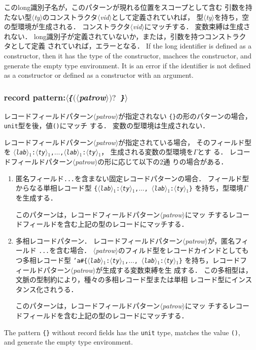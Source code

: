 \documentclass{jbook}
\newcommand{\txt}[2]{#2}
\newcommand{\code}[1]{\mbox{\large\tt #1}}
\newcommand{\nonterm}[1]{\mbox{$\langle$}{\it #1}\mbox{$\rangle$}}
\newcommand{\term}[1]{\mbox{{\tt #1}}}
\newcommand{\optional}[1]{\mbox{$($}{\protect #1}\mbox{$)?$}}
\newcommand{\ass}{\Gamma}
\begin{document}
\ifjp%
	このlong識別子名が，このパターンが現れる位置をスコープとして含む
引数を持たない型\nonterm{ty}のコンストラクタ\nonterm{vid}として定義されていれば，
型\nonterm{ty}を持ち，空の型環境が生成される．
	コンストラクタ\nonterm{vid}にマッチする．
	変数束縛は生成されない．
	long識別子が定義されていないか，または，引数を持つコンストラクタとして定義
されていれば，エラーとなる．
\else%
	If the long identifier is defined as a constructor, then it has the
type of the constructor, machces the constructor, and generate the empty
type environment.
	It is an error if the identifier is not defined as a constructor
or defined as a constructor with an argument.
\fi%

\subsubsection{\txt{レコードパターン}{record pattern}:\nonterm{\term{\{}\optional{\nonterm{patrow}}\ \term{\}}}}

\ifjp%
		レコードフィールドパターン\nonterm{patrow}が指定されない
\code{\{\}}の形のパターンの場合，\code{unit}型を後，値\code{()}にマッチ
する．
	変数の型環境は生成されない．

	レコードフィールドパターン\nonterm{patrow}が指定されている場合，
そのフィールド型を
\code{\nonterm{lab}$_1$:\nonterm{ty}$_1$,$\ldots$,\nonterm{lab}$_1$:\nonterm{ty}$_1$}，
生成される変数の型環境を$\ass$とす
る．
	レコードフィールドパターン\nonterm{patrow}の形に応じて以下の2通
りの場合がある．
\begin{enumerate}
\item 匿名フィールド\verb|...|を含まない固定レコードパターンの場合．
フィールド型からなる単相レコード型
\code{\{\nonterm{lab}$_1$:\nonterm{ty}$_1$,$\ldots$,
\nonterm{lab}$_1$:\nonterm{ty}$_1$\}}
を持ち，型環境$\ass$を生成する．

	このパターンは，レコードフィールドパターン\nonterm{patrow}にマッ
チするレコードフィールドを含む上記の型のレコードにマッチする．

\item 多相レコードパターン．
	レコードフィールドパターン\nonterm{patrow}が，匿名フィールド
\verb|...|を含む場合．
	\nonterm{patrow}のフィルド型をレコードカインドとしてもつ多相レコード型
\code{'a\#\{\nonterm{lab}$_1$:\nonterm{ty}$_1$,$\ldots$,
\nonterm{lab}$_1$:\nonterm{ty}$_1$\}}
を持ち，レコードフィールドパターン\nonterm{patrow}が生成する変数束縛を生
成する．
	この多相型は，文脈の型制約により，種々の多相レコード型または単相
レコード型にインスタンス化されうる．

	このパターンは，レコードフィールドパターン\nonterm{patrow}にマッ
チするレコードフィールドを含む上記の型のレコードにマッチする．
\end{enumerate}
\else%
	The pattern \code{\{\}} without record fields has the 
\code{unit} type, matches the value \code{()}, and generate the empty
type environment.
\end{document}
